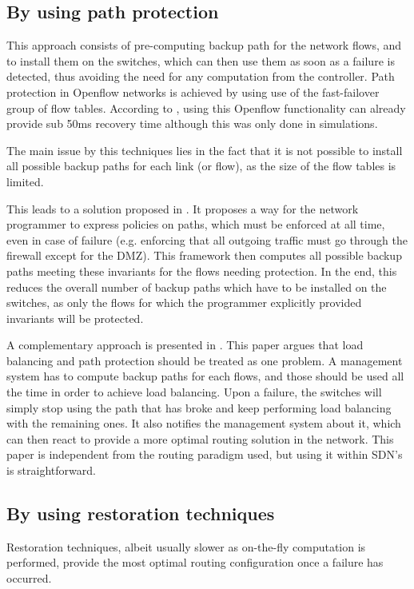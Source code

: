 \documentclass[compsoc]{IEEEtran}
\begin{document}
\subsection{By using path protection}
This approach consists of pre-computing backup path for the network flows, and to install them on the switches, which can then use them as soon as a failure is detected, thus avoiding the need for any computation from the controller. Path protection in Openflow networks is achieved by using use of the fast-failover group of flow tables. According to \cite{Sharma:2013:OMC:2445634.2445903}, using this Openflow functionality can already provide sub 50ms recovery time although this was only done in simulations.

The main issue by this techniques lies in the fact that it is not possible to install all possible backup paths for each link (or flow), as the size of the flow tables is limited.

This leads to a solution proposed in \cite{Reitblatt:2013:FDF:2491185.2491187}. It proposes a way for the network programmer to express policies on paths, which must be enforced at all time, even in case of failure (e.g. enforcing that all outgoing traffic must go through the firewall except for the DMZ). This framework then computes all possible backup paths meeting these invariants for the flows needing protection. In the end, this reduces the overall number of backup paths which have to be installed on the switches, as only the flows for which the programmer explicitly provided invariants will be protected.

A complementary approach is presented in \cite{Suchara:2011:NAJ:1993744.1993756}. This paper argues that load balancing and path protection should be treated as one problem. A management system has to compute backup paths for each flows, and those should be used all the time in order to achieve load balancing. Upon a failure, the switches will simply stop using the path that has broke and keep performing load balancing with the remaining ones. It also notifies the management system about it, which can then react to provide a more optimal routing solution in the network. This paper is independent from the routing paradigm used, but using it within SDN's is straightforward.

\subsection{By using restoration techniques}
Restoration techniques, albeit usually slower as on-the-fly computation is performed, provide the most optimal routing configuration once a failure has occurred.
\end{document}
